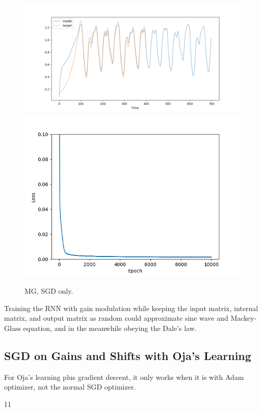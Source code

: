 \documentclass[12pt, a4paper]{article}
\begin{document}
\begin{figure}[H]
    \centering
    \includegraphics[width=\textwidth]{analysis/fig/1016_MG_bpgain_output.png}
    \includegraphics[width=\textwidth]{analysis/fig/1016_MG_bpgain_loss.png}
    \caption{MG, SGD only.}
\end{figure}

Training the RNN with gain modulation while keeping the input matrix, internal matrix, and output matrix as random could approximate sine wave and Mackey-Glass equation, and in the meanwhile obeying the Dale's law.

\subsection*{SGD on Gains and Shifts with Oja's Learning}

For Oja's learning plus gradient descent, it only works when it is with Adam optimizer, not the normal SGD optimizer.

11
\end{document}
